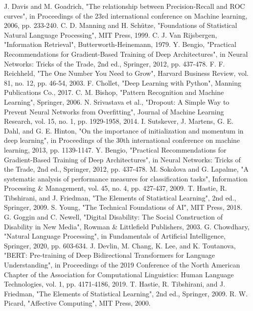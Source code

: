 \documentclass[conference]{IEEEtran}
\begin{document}
\begin{thebibliography}{00}
     J. Davis and M. Goadrich, "The relationship between Precision-Recall and ROC curves", in Proceedings of the 23rd international conference on Machine learning, 2006, pp. 233-240.
     C. D. Manning and H. Schütze, "Foundations of Statistical Natural Language Processing", MIT Press, 1999.
     C. J. Van Rijsbergen, "Information Retrieval", Butterworth-Heinemann, 1979.
     Y. Bengio, "Practical Recommendations for Gradient-Based Training of Deep Architectures", in Neural Networks: Tricks of the Trade, 2nd ed., Springer, 2012, pp. 437-478.
     F. F. Reichheld, "The One Number You Need to Grow", Harvard Business Review, vol. 81, no. 12, pp. 46-54, 2003.
     F. Chollet, "Deep Learning with Python", Manning Publications Co., 2017.
     C. M. Bishop, "Pattern Recognition and Machine Learning", Springer, 2006.
     N. Srivastava et al., "Dropout: A Simple Way to Prevent Neural Networks from Overfitting", Journal of Machine Learning Research, vol. 15, no. 1, pp. 1929-1958, 2014.
     I. Sutskever, J. Martens, G. E. Dahl, and G. E. Hinton, "On the importance of initialization and momentum in deep learning", in Proceedings of the 30th international conference on machine learning, 2013, pp. 1139-1147.
     Y. Bengio, "Practical Recommendations for Gradient-Based Training of Deep Architectures", in Neural Networks: Tricks of the Trade, 2nd ed., Springer, 2012, pp. 437-478.
     M. Sokolova and G. Lapalme, "A systematic analysis of performance measures for classification tasks", Information Processing \& Management, vol. 45, no. 4, pp. 427-437, 2009.
     T. Hastie, R. Tibshirani, and J. Friedman, "The Elements of Statistical Learning", 2nd ed., Springer, 2009.
     S. Young, "The Technical Foundations of AI", MIT Press, 2018.
     G. Goggin and C. Newell, "Digital Disability: The Social Construction of Disability in New Media", Rowman \& Littlefield Publishers, 2003.
     G. Chowdhary, "Natural Language Processing", in Fundamentals of Artificial Intelligence, Springer, 2020, pp. 603-634.
     J. Devlin, M. Chang, K. Lee, and K. Toutanova, "BERT: Pre-training of Deep Bidirectional Transformers for Language Understanding", in Proceedings of the 2019 Conference of the North American Chapter of the Association for Computational Linguistics: Human Language Technologies, vol. 1, pp. 4171-4186, 2019.
     T. Hastie, R. Tibshirani, and J. Friedman, "The Elements of Statistical Learning", 2nd ed., Springer, 2009.
     R. W. Picard, "Affective Computing", MIT Press, 2000.




\end{thebibliography}
\end{document}
